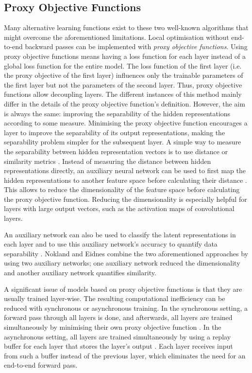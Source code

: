 \subsection{Proxy Objective Functions}
Many alternative learning functions exist to these two well-known algorithms that might overcome the aforementioned limitations.
Local optimisation without end-to-end backward passes can be implemented with \emph{proxy objective functions}.
Using proxy objective functions means having a loss function for each layer instead of a global loss function for the entire model.
The loss function of the first layer (i.e. the proxy objective of the first layer) influences only the trainable parameters of the first layer but not the parameters of the second layer.
Thus, proxy objective functions allow decoupling layers.
The different instances of this method mainly differ in the details of the proxy objective function's definition.
However, the aim is always the same: improving the separability of the hidden representations according to some measure.
Minimising the proxy objective function encourages a layer to improve the separability of its output representations, making the separability problem simpler for the subsequent layer.
A simple way to measure the separability between hidden representation vectors is to use distance or similarity metrics .
Instead of measuring the distance between hidden representations directly, an auxiliary neural network can be used to first map the hidden representations to another feature space before calculating their distance .
This allows to reduce the dimensionality of the feature space before calculating the proxy objective function.
Reducing the dimensionality is especially helpful for layers with large output vectors, such as the activation maps of convolutional layers.


An auxiliary network can also be used to classify the latent representations in each layer and to use this auxiliary network's accuracy to quantify data separability .
Nokland and Eidnes  combine the two aforementioned approaches by using two auxiliary networks; one auxiliary network reduced the dimensionality and another auxiliary network quantifies similarity.

A significant issue of models based on proxy objective functions is that they are usually trained layer-wise.
The resulting computational inefficiency can be reduced with synchronous or asynchronous training.
In the synchronous setting, a forward pass through all layers is done, and afterwards, all layers are trained simultaneously by minimising their own proxy objective function \cite{belilovsky2019greedy}.
In the asynchronous setting, all layers are trained simultaneously by using a replay buffer for each layer that stores the layer's output .
Each layer receives input from such a buffer instead of the previous layer, which eliminates the need for an end-to-end forward pass.

